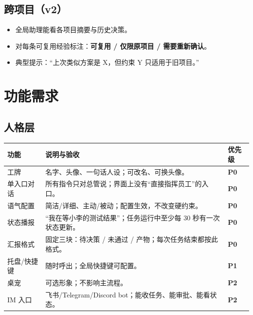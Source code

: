 \documentclass[UTF8,11pt,a4paper,fontset=windows]{ctexart}
\let\ocsection\section
\renewcommand{\section}{\Needspace{8\baselineskip}\ocsection}
\let\ocsubsection\subsection
\renewcommand{\subsection}{\Needspace{5\baselineskip}\ocsubsection}
\newcommand{\pzero}{\textcolor{accent}{\textbf{P0}}}
\newcommand{\pone}{\textcolor{primary}{\textbf{P1}}}
\newcommand{\ptwo}{\textcolor{muted}{\textbf{P2}}}
\begin{document}
\subsection{跨项目（v2）}

\begin{itemize}
  \item 全局助理能看各项目摘要与历史决策。
  \item 对每条可复用经验标注：\textbf{可复用 / 仅限原项目 / 需要重新确认}。
  \item 典型提示：“上次类似方案是 X，但约束 Y 只适用于旧项目。”
\end{itemize}

\section{功能需求}
\label{sec:features}

\subsection{人格层}

\noindent\begin{minipage}{\linewidth}
\centering
{}
\small
\begin{tabularx}{\linewidth}{@{}p{2.6cm} X p{1.6cm}@{}}
\toprule
\textbf{功能} & \textbf{说明与验收} & \textbf{优先级} \\
\midrule
工牌 & 名字、头像、一句话人设；可改名、可换头像。 & \pzero \\
单入口对话 & 所有指令只对总管说；界面上没有“直接指挥员工”的入口。 & \pzero \\
语气配置 & 简洁/详细、主动/被动；配置生效，不改变硬约束。 & \pzero \\
状态播报 & “我在等小李的测试结果”；任务运行中至少每 30 秒有一次状态更新。 & \pzero \\
汇报格式 & 固定三块：待决策 / 未通过 / 产物；每次任务结束都按此格式。 & \pzero \\
托盘/快捷键 & 随时呼出；全局快捷键可配置。 & \pone \\
桌宠 & 可选形象；不影响主流程。 & \ptwo \\
IM 入口 & 飞书/Telegram/Discord bot；能收任务、能审批、能看状态。 & \ptwo \\
\bottomrule
\end{tabularx}
\end{minipage}
\end{document}
